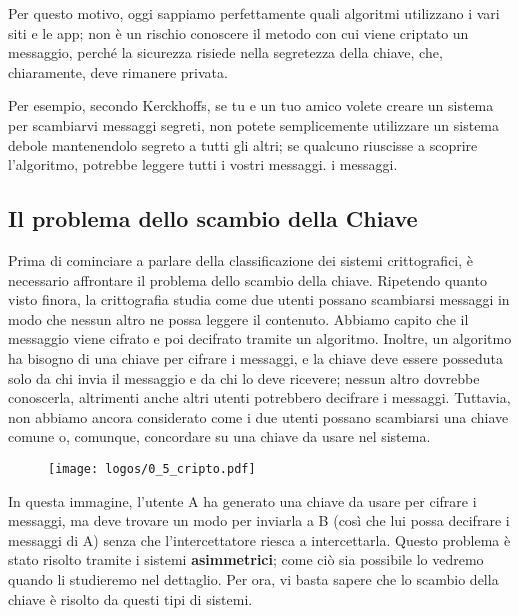 \documentclass{report}
\begin{document}
Per questo motivo, oggi sappiamo perfettamente quali algoritmi utilizzano i vari siti e le app; non è un rischio conoscere il metodo con cui viene criptato un messaggio, perché la sicurezza risiede nella segretezza della chiave, che, chiaramente, deve rimanere privata. 


Per esempio, secondo Kerckhoffs, se tu e un tuo amico volete creare un sistema per scambiarvi messaggi segreti, non potete semplicemente utilizzare un sistema debole mantenendolo segreto a tutti gli altri; se qualcuno riuscisse a scoprire l’algoritmo, potrebbe leggere tutti i vostri messaggi. i messaggi.



\newpage

\subsection{Il problema dello scambio della Chiave}

Prima di cominciare a parlare della classificazione dei sistemi crittografici, è necessario affrontare il problema dello scambio della chiave. Ripetendo quanto visto finora, la crittografia studia come due utenti possano scambiarsi messaggi in modo che nessun altro ne possa leggere il contenuto. Abbiamo capito che il messaggio viene cifrato e poi decifrato tramite un algoritmo. Inoltre, un algoritmo ha bisogno di una chiave per cifrare i messaggi, e la chiave deve essere posseduta solo da chi invia il messaggio e da chi lo deve ricevere; nessun altro dovrebbe conoscerla, altrimenti anche altri utenti potrebbero decifrare i messaggi. Tuttavia, non abbiamo ancora considerato come i due utenti possano scambiarsi una chiave comune o, comunque, concordare su una chiave da usare nel sistema.


\begin{figure}[h]
    \centering
    \texttt{[image: logos/0\_5\_cripto.pdf]}
\end{figure}

In questa immagine, l’utente A ha generato una chiave da usare per cifrare i messaggi, ma deve trovare un modo per inviarla a B (così che lui possa decifrare i messaggi di A) senza che l’intercettatore riesca a intercettarla. Questo problema è stato risolto tramite i sistemi \textbf{asimmetrici}; come ciò sia possibile lo vedremo quando li studieremo nel dettaglio. Per ora, vi basta sapere che lo scambio della chiave è risolto da questi tipi di sistemi.
\end{document}
